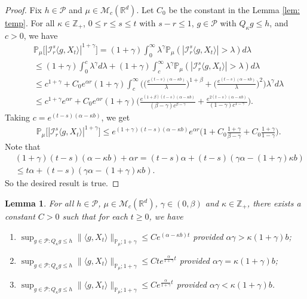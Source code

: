\documentclass[12pt,a4paper]{amsart}
\theoremstyle{plain}
\newtheorem{lem}[thm]{Lemma}
\theoremstyle{definition}
\numberwithin{equation}{section}
\begin{document}
\begin{proof}
  Fix $h \in \mathcal P$ and $\mu \in \mathcal M_c(\mathbb R^d)$. Let $C_0$ be the constant in the Lemma \ref{lem: temp}.
  For all $\kappa \in \mathbb Z_+$,  $0\leq r\leq s\leq t$ with $s-r \leq 1$,  $g\in \mathcal P$ with $Q_{\kappa} g \leq h$, and $c>0$, we have
\begin{align}
  & \mathbb P_\mu\big[|\mathcal I_r^s\langle g, X_t\rangle|^{1+\gamma}\big]
    = (1+\gamma)\int_0^\infty \lambda^{\gamma} \mathbb P_{\mu}(|\mathcal I_r^s\langle g, X_t\rangle|>\lambda) d\lambda \\ 
  & \leq (1+\gamma)\int_0^c \lambda^{\gamma} d\lambda +(1+\gamma)\int_c^\infty \lambda^{\gamma}\mathbb P_\mu(|\mathcal I_r^s\langle g, X_t\rangle|> \lambda) d\lambda \\
  & \leq c^{1+\gamma} + C_0  e^{\alpha r}(1+\gamma)\int_c^\infty \bigg(\Big(\frac{e^{(t-s)(\alpha - \kappa b)}}{\lambda}\Big)^{1+\beta}+\Big(\frac{e^{(t-s)(\alpha - \kappa b)}}{\lambda}\Big)^{2}\bigg)\lambda^{\gamma}d\lambda \\
  & \leq c^{1+\gamma} e^{\alpha r} + C_0e^{\alpha r}(1+\gamma)\Big(  \frac{e^{(1+\beta)(t-s)(\alpha- \kappa b)}}{(\beta - \gamma)c^{\beta - \gamma}}  + \frac{e^{2(t-s)(\alpha- \kappa b)}}{(1 - \gamma)c^{1 - \gamma}} \Big).
\end{align}
Taking $c = e^{(t-s)(\alpha- \kappa b)}$, we get
\begin{align}
  & \mathbb P_\mu\big[|\mathcal I_r^s\langle g, X_t\rangle|^{1+\gamma}\big]
    \leq e^{(1+\gamma)(t-s)(\alpha- \kappa b)} e^{\alpha r}\Big(1+ C_0 \frac{1+\gamma}{\beta - \gamma}+ C_0 \frac{1+\gamma}{1 - \gamma}\Big).
\end{align}
Note that
\begin{align}
  & (1+\gamma) (t-s) (\alpha- \kappa b) + \alpha r
    = (t-s)\alpha+(t-s) (\gamma \alpha- (1+\gamma )\kappa b) \\
  & \leq t\alpha+(t-s) (\gamma \alpha- (1+\gamma)\kappa b).
\end{align}
So the desired result is true.
\end{proof}
\begin{lem}
  \label{lem:P:M:uc}
  For all $h \in \mathcal P$, $\mu \in \mathcal M_c(\mathbb R^d)$, $\gamma\in (0, \beta)$ and $\kappa \in \mathbb Z_+$, there exists a constant $C > 0$ such that for each $t\geq 0$, we have
  \begin{enumerate}
  \item
    \label{item:P:M:uc:1}
    $\sup_{g\in \mathcal P: Q_\kappa g \leq h}\|\langle g,X_t\rangle\|_{\mathbb{P}_{\mu};1+\gamma}\leq C e^{(\alpha-\kappa b)t}$ provided $\alpha\gamma > \kappa (1+\gamma)b$;
  \item
    \label{item:P:M:uc:2}
    $\sup_{g\in \mathcal P: Q_\kappa g \leq h}\|\langle g,X_t\rangle\|_{\mathbb{P}_{\mu};1+\gamma}\leq C te^{\frac{\alpha}{1+\gamma}t}$ provided $\alpha\gamma = \kappa (1+\gamma)b$;
  \item
    \label{item:P:M:uc:3}
    $\sup_{g\in \mathcal P: Q_\kappa g \leq h} \|\langle g,X_t\rangle\|_{\mathbb{P}_{\mu};1+\gamma}\leq C e^{\frac{\alpha}{1+\gamma}t}$ provided $\alpha\gamma < \kappa (1+\gamma)b$.
  \end{enumerate}
\end{lem}
\end{document}
